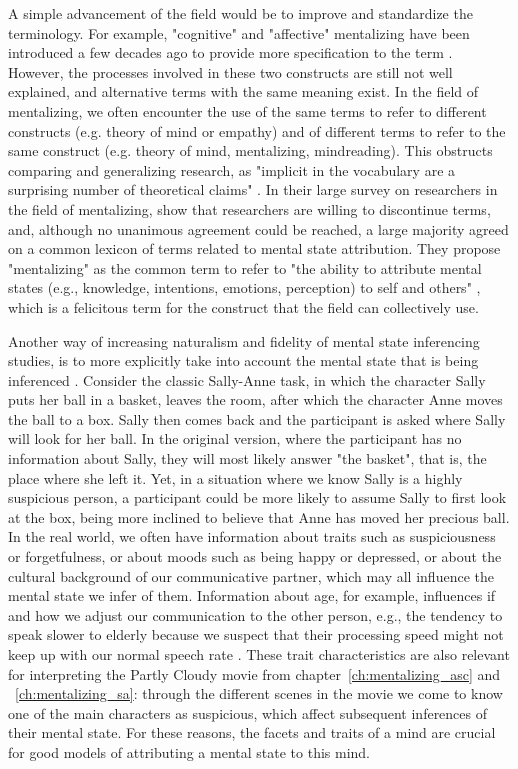 A simple advancement of the field would be to improve and standardize the terminology. For example, "cognitive" and "affective" mentalizing have been introduced a few decades ago to provide more specification to the term \citep{brothers1992,shamay2009}. However, the processes involved in these two constructs are still not well explained, and alternative terms with the same meaning exist. In the field of mentalizing, we often encounter the use of the same terms to refer to different constructs (e.g. theory of mind or empathy) and of different terms to refer to the same construct (e.g. theory of mind, mentalizing, mindreading). This obstructs comparing and generalizing research, as "implicit in the vocabulary are a surprising number of theoretical claims" \citep[p. 14]{searle1992}. In their large survey on researchers in the field of mentalizing, \cite{quesque2024} show that researchers are willing to discontinue terms, and, although no unanimous agreement could be reached, a large majority agreed on a common lexicon of terms related to mental state attribution. They propose "mentalizing" as the common term to refer to "the ability to attribute mental states (e.g., knowledge, intentions, emotions, perception) to self and others" \citep[p. 2]{quesque2024}, which is a felicitous term for the construct that the field can collectively use. 

Another way of increasing naturalism and fidelity of mental state inferencing studies, is to more explicitly take into account the mental state that is being inferenced \citep{conway2019}. Consider the classic Sally-Anne task, in which the character Sally puts her ball in a basket, leaves the room, after which the character Anne moves the ball to a box. Sally then comes back and the participant is asked where Sally will look for her ball. In the original version, where the participant has no information about Sally, they will most likely answer "the basket", that is, the place where she left it. Yet, in a situation where we know Sally is a highly suspicious person, a participant could be more likely to assume Sally to first look at the box, being more inclined to believe that Anne has moved her precious ball. In the real world, we often have information about traits such as suspiciousness or forgetfulness, or about moods such as being happy or depressed, or about the cultural background of our communicative partner, which may all influence the mental state we infer of them. Information about age, for example, influences if and how we adjust our communication to the other person, e.g., the tendency to speak slower to elderly because we suspect that their processing speed might not keep up with our normal speech rate \citep{stolk2013,kemper1999}. These trait characteristics are also relevant for interpreting the Partly Cloudy movie from chapter~\ref{ch:mentalizing_asc} and ~\ref{ch:mentalizing_sa}: through the different scenes in the movie we come to know one of the main characters as suspicious, which affect subsequent inferences of their mental state. For these reasons, the facets and traits of a mind are crucial for good models of attributing a mental state to this mind. 


